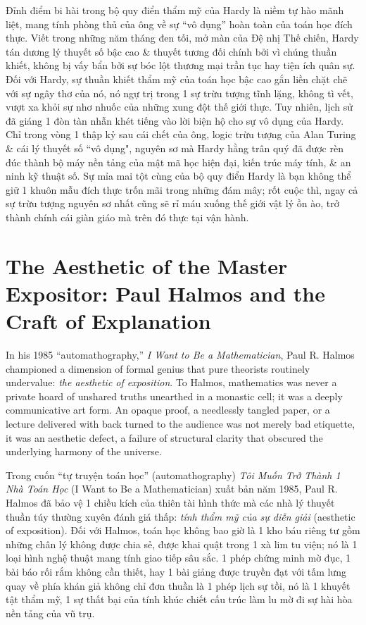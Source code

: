 \documentclass[11pt]{article}
\begin{document}
Đỉnh điểm bi hài trong bộ quy điển thẩm mỹ của Hardy là niềm tự hào mãnh liệt, mang tính phòng thủ của ông về sự ``vô dụng'' hoàn toàn của toán học đích thực. Viết trong những năm tháng đen tối, mở màn của Đệ nhị Thế chiến, Hardy tán dương lý thuyết số bậc cao \& thuyết tương đối chính bởi vì chúng thuần khiết, không bị vấy bẩn bởi sự bóc lột thương mại trần tục hay tiện ích quân sự. Đối với Hardy, sự thuần khiết thẩm mỹ của toán học bậc cao gắn liền chặt chẽ với sự ngây thơ của nó, nó ngự trị trong 1 sự trừu tượng tĩnh lặng, không tì vết, vượt xa khỏi sự nhơ nhuốc của những xung đột thế giới thực. Tuy nhiên, lịch sử đã giáng 1 đòn tàn nhẫn khét tiếng vào lời biện hộ cho sự vô dụng của Hardy. Chỉ trong vòng 1 thập kỷ sau cái chết của ông, logic trừu tượng của Alan Turing \& cái lý thuyết số ``vô dụng", nguyên sơ mà Hardy hằng trân quý đã được rèn đúc thành bộ máy nền tảng của mật mã học hiện đại, kiến trúc máy tính, \& an ninh kỹ thuật số. Sự mỉa mai tột cùng của bộ quy điển Hardy là bạn không thể giữ 1 khuôn mẫu đích thực trốn mãi trong những đám mây; rốt cuộc thì, ngay cả sự trừu tượng nguyên sơ nhất cũng sẽ rỉ máu xuống thế giới vật lý ồn ào, trở thành chính cái giàn giáo mà trên đó thực tại vận hành.

\section{The Aesthetic of the Master Expositor: Paul Halmos and the Craft of Explanation}
In his 1985 ``automathography,'' \textit{I Want to Be a Mathematician}, Paul R. Halmos \cite{Halmos1985} championed a dimension of formal genius that pure theorists routinely undervalue: \emph{the aesthetic of exposition}. To Halmos, mathematics was never a private hoard of unshared truths unearthed in a monastic cell; it was a deeply communicative art form. An opaque proof, a needlessly tangled paper, or a lecture delivered with back turned to the audience was not merely bad etiquette, it was an aesthetic defect, a failure of structural clarity that obscured the underlying harmony of the universe.

Trong cuốn ``tự truyện toán học'' (automathography) \textit{Tôi Muốn Trở Thành 1 Nhà Toán Học} (I Want to Be a Mathematician) xuất bản năm 1985, Paul R. Halmos \cite{Halmos1985} đã bảo vệ 1 chiều kích của thiên tài hình thức mà các nhà lý thuyết thuần túy thường xuyên đánh giá thấp: \emph{tính thẩm mỹ của sự diễn giải} (aesthetic of exposition). Đối với Halmos, toán học không bao giờ là 1 kho báu riêng tư gồm những chân lý không được chia sẻ, được khai quật trong 1 xà lim tu viện; nó là 1 loại hình nghệ thuật mang tính giao tiếp sâu sắc. 1 phép chứng minh mờ đục, 1 bài báo rối rắm không cần thiết, hay 1 bài giảng được truyền đạt với tấm lưng quay về phía khán giả không chỉ đơn thuần là 1 phép lịch sự tồi, nó là 1 khuyết tật thẩm mỹ, 1 sự thất bại của tính khúc chiết cấu trúc làm lu mờ đi sự hài hòa nền tảng của vũ trụ.
\end{document}
